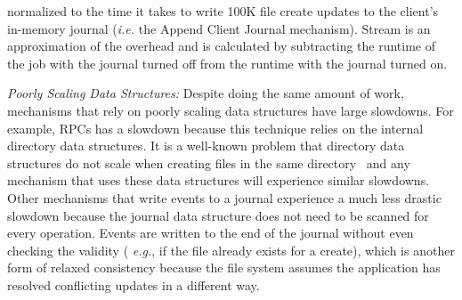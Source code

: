 
 normalized to the time
it takes to write 100K file create updates to the client's in-memory journal
({\it i.e.} the Append Client Journal mechanism).   Stream is an
approximation of the overhead and is calculated by subtracting the runtime of
the job with the journal turned off from the runtime with the journal turned
on.  

{\it Poorly Scaling Data Structures:} Despite doing the same amount of work,
mechanisms that rely on poorly scaling data structures have large
slowdowns. For example, RPCs has
a \oldcomment{\(90\times\)}\newcomment{\(18\times\)} slowdown because this
technique relies on the internal directory data structures. It is a well-known
problem that directory data structures do not scale when creating files in the
same directory~\cite{ren:sc2014-indexfs} and any mechanism that uses these data
structures will experience similar slowdowns. Other mechanisms that write
events to a journal experience a much less drastic slowdown because the journal
data structure does not need to be scanned for every operation.  Events are
written to the end of the journal without even checking the validity ({\it
e.g.}, if the file already exists for a create), which is another form of
relaxed consistency because the file system assumes the application has
resolved conflicting updates in a different way.

